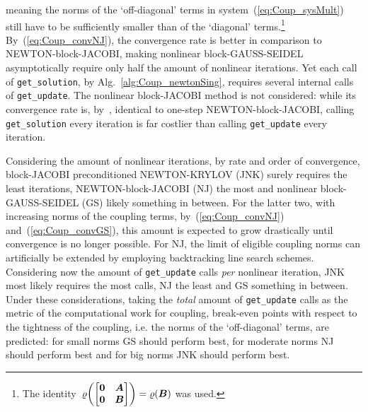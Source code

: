 \documentclass[10pt, ngerman, english,
twoside, open=right,
numbers=noenddot,
declaration=section,
abstract=section,
abstract=multiple,
abstract=notoc,
declaration=notoc,
cd=pale, 
chapterprefix=off, 
chapterpage=false, 
headingsvskip=-10em,
cdgeometry=custom, 
slantedgreek=on,
cdmath=on, 
cdfont=on,
ttfont=false,
mathswap=off,
]{tudscrreprt}
\numberwithin{equation}{chapter}
\renewcommand{\textsc}[1]{\uppercase{\mbox{#1}}}
\newcommand{\sidenote}[1]{
  \leavevmode %
  \marginpar{\hyphenpenalty=1000 \flushleft{\textcolor{HKS41}{#1}}}}
\begin{document}
meaning the norms of the `off-diagonal' terms in system~(\ref{eq:Coup_sysMult}) still have to be sufficiently smaller than of the `diagonal' terms.\footnote{The identity~$\varrho\left( \begin{bmatrix} \mat 0 & \mat A \\ \mat 0 & \mat B \end{bmatrix} \right) = \varrho\left( \mat B \right)$ was used.}
By~(\ref{eq:Coup_convNJ}), the convergence rate is better in comparison to \textsc{Newton}-block-\textsc{Jacobi}, making nonlinear block-\textsc{Gau\ss}-\textsc{Seidel} asymptotically require only half the amount of nonlinear iterations. Yet each call of \texttt{get\_solution}, by Alg.~\ref{alg:Coup_newtonSing}, requires several internal calls of \texttt{get\_update}. 
The nonlinear block-\textsc{Jacobi} method is not considered: while its convergence rate is, by~\cite[see][Th.~10.3.5, applied to \textsc{Jacobi}]{Ortega}, identical to one-step \textsc{Newton}-block-\textsc{Jacobi}, calling \texttt{get\_solution} every iteration is far costlier than calling \texttt{get\_update} every iteration.\par
\sidenote{Performance Estimates}Considering the amount of nonlinear iterations, by rate and order of convergence, block-\textsc{Jacobi} preconditioned \textsc{Newton}-\textsc{Krylov} (JNK) surely requires the least iterations, \textsc{Newton}-block-\textsc{Jacobi} (NJ) the most and nonlinear block-\textsc{Gau\ss}-\textsc{Seidel} (GS) likely something in between. For the latter two, with increasing norms of the coupling terms, by~(\ref{eq:Coup_convNJ}) and~(\ref{eq:Coup_convGS}), this amount is expected to grow drastically until convergence is no longer possible. For NJ, the limit of eligible coupling norms can artificially be extended by employing backtracking line search schemes.
Considering now the amount of \texttt{get\_update} calls \emph{per} nonlinear iteration, JNK most likely requires the most calls, NJ the least and GS something in between. 
Under these considerations, taking the \emph{total} amount of \texttt{get\_update} calls as the metric of the computational work for coupling, break-even points with respect to the tightness of the coupling, i.e. the norms of the `off-diagonal' terms, are predicted: for small norms GS should perform best, for moderate norms NJ should perform best and for big norms JNK should perform best.
\end{document}
